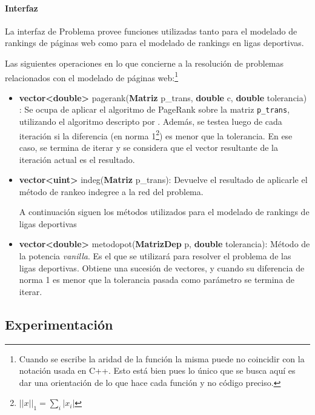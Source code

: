 \paragraph{Interfaz}

La interfaz de Problema provee funciones utilizadas tanto para el modelado de rankings de páginas web como para el modelado de rankings en ligas deportivas.

Las siguientes operaciones en lo que concierne a la resolución de problemas relacionados con el modelado de páginas web:\footnote{Cuando se escribe la aridad de la función la misma puede no coincidir con la notación usada en C++. Esto está bien pues lo único que se busca aquí es dar una orientación de lo que hace cada función y no código preciso.}

\begin{itemize}
    \item  \textbf{vector<double>} pagerank(\textbf{Matriz} p\_trans, \textbf{double} c, \textbf{double} tolerancia) :
        Se ocupa de aplicar el algoritmo de PageRank sobre la matriz \texttt{p\_trans}, utilizando el algoritmo descripto por \cite[Algoritmo 1]{Kamvar2003}. Además, se testea luego de cada iteración si la diferencia (en norma 1\footnote{$||x||_1 = \sum_i |x_i|$}) es menor que la tolerancia. En ese caso, se termina de iterar y se considera que el vector resultante de la iteración actual es el resultado. 
          
    \item \textbf{vector<uint>} indeg(\textbf{Matriz} p\_trans):  Devuelve el resultado de aplicarle el m\'etodo de rankeo indegree a la red del problema.

A continuación siguen los m\'etodos utilizados para el modelado de rankings de ligas deportivas

  \item \textbf{vector<double>} metodopot(\textbf{MatrizDep} p, \textbf{double} tolerancia):
      M\'etodo de la potencia \emph{vanilla}. Es el que se utilizará para resolver el problema de las ligas deportivas. Obtiene una sucesión de vectores, y cuando su diferencia de norma 1 es menor que la tolerancia pasada como parámetro se termina de iterar.   

\end{itemize}

\subsection{Experimentación}

